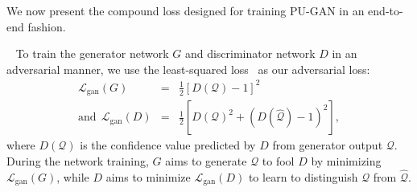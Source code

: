 

We now present the compound loss designed for training PU-GAN in an end-to-end fashion.





 \
To train the generator network $G$ and discriminator network $D$ in an adversarial manner, we use the least-squared loss~\cite{mao2017least} as our adversarial loss:
%
\begin{eqnarray}
\mathcal{L}_{\text{gan}}(G)&=&\frac{1}{2}[D(\mathcal{Q})-1]^2 \\
\text{and} \ \
\mathcal{L}_{\text{gan}}(D)&=&\frac{1}{2}[D(\mathcal{Q})^2 + (D(\mathcal{\hat{Q}})-1)^2],
\end{eqnarray}
%
where
$D(\mathcal{Q})$ is the confidence value predicted by $D$ from generator output $\mathcal{Q}$.
%
During the network training, $G$ aims to generate $\mathcal{Q}$ to fool $D$ by minimizing $\mathcal{L}_{\text{gan}}(G)$, while $D$ aims to minimize $\mathcal{L}_{\text{gan}}(D)$ to learn to distinguish $\mathcal{Q}$ from $\mathcal{\hat{Q}}$.
%




